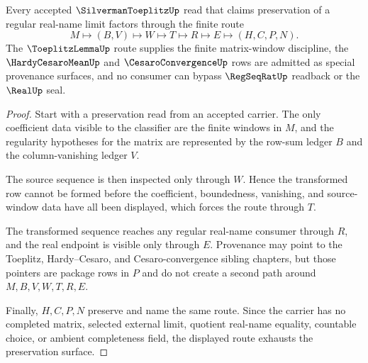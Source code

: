 \begin{theorem}\label{thm:silverman-toeplitz-regularity-route}
Every accepted $\SilvermanToeplitzUp$ read that claims preservation of a regular real-name limit factors through the finite route
$$
M \longmapsto (B,V) \longmapsto W \longmapsto T \longmapsto R \longmapsto E \longmapsto (H,C,P,N).
$$
The $\ToeplitzLemmaUp$ route supplies the finite matrix-window discipline, the $\HardyCesaroMeanUp$ and $\CesaroConvergenceUp$ rows are admitted as special provenance surfaces, and no consumer can bypass $\RegSeqRatUp$ readback or the $\RealUp$ seal.
\end{theorem}
\begin{proof}
Start with a preservation read from an accepted carrier. The only coefficient data visible to the classifier are the finite windows in $M$, and the regularity hypotheses for the matrix are represented by the row-sum ledger $B$ and the column-vanishing ledger $V$.

The source sequence is then inspected only through $W$. Hence the transformed row cannot be formed before the coefficient, boundedness, vanishing, and source-window data have all been displayed, which forces the route through $T$.

The transformed sequence reaches any regular real-name consumer through $R$, and the real endpoint is visible only through $E$. Provenance may point to the Toeplitz, Hardy--Cesaro, and Cesaro-convergence sibling chapters, but those pointers are package rows in $P$ and do not create a second path around $M,B,V,W,T,R,E$.

Finally, $H,C,P,N$ preserve and name the same route. Since the carrier has no completed matrix, selected external limit, quotient real-name equality, countable choice, or ambient completeness field, the displayed route exhausts the preservation surface.
\end{proof}


